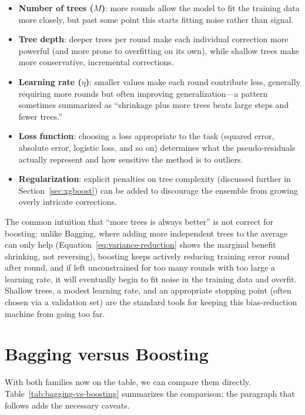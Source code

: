 \documentclass[12pt,a4paper]{article}
\begin{document}
\begin{itemize}[nosep]
    \item \textbf{Number of trees ($M$)}: more rounds allow the model to fit the training data more closely, but past some point this starts fitting noise rather than signal.
    \item \textbf{Tree depth}: deeper trees per round make each individual correction more powerful (and more prone to overfitting on its own), while shallow trees make more conservative, incremental corrections.
    \item \textbf{Learning rate ($\eta$)}: smaller values make each round contribute less, generally requiring more rounds but often improving generalization---a pattern sometimes summarized as ``shrinkage plus more trees beats large steps and fewer trees.''
    \item \textbf{Loss function}: choosing a loss appropriate to the task (squared error, absolute error, logistic loss, and so on) determines what the pseudo-residuals actually represent and how sensitive the method is to outliers.
    \item \textbf{Regularization}: explicit penalties on tree complexity (discussed further in Section~\ref{sec:xgboost}) can be added to discourage the ensemble from growing overly intricate corrections.
\end{itemize}

The common intuition that ``more trees is always better'' is not correct for boosting: unlike Bagging, where adding more independent trees to the average can only help (Equation~\eqref{eq:variance-reduction} shows the marginal benefit shrinking, not reversing), boosting keeps actively reducing training error round after round, and if left unconstrained for too many rounds with too large a learning rate, it will eventually begin to fit noise in the training data and overfit. Shallow trees, a modest learning rate, and an appropriate stopping point (often chosen via a validation set) are the standard tools for keeping this bias-reduction machine from going too far.

\section{Bagging versus Boosting}

With both families now on the table, we can compare them directly. Table~\ref{tab:bagging-vs-boosting} summarizes the comparison; the paragraph that follows adds the necessary caveats.
\end{document}
